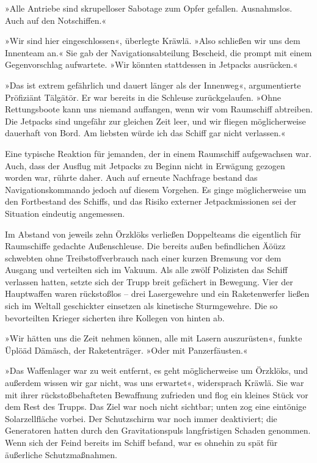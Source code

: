 »Alle Antriebe sind skrupelloser Sabotage zum Opfer gefallen. Ausnahmslos. Auch auf den Notschiffen.«

»Wir sind hier eingeschlossen«, überlegte Kräwlä. »Also schließen wir uns dem Innenteam an.« Sie gab der Navigationsabteilung Bescheid, die prompt mit einem Gegenvorschlag aufwartete. »Wir könnten stattdessen in Jetpacks ausrücken.«

»Das ist extrem gefährlich und dauert länger als der Innenweg«, argumentierte Pröfiziänt Tälgätör. Er war bereits in die Schleuse zurückgelaufen. »Ohne Rettungsboote kann uns niemand auffangen, wenn wir vom Raumschiff abtreiben. Die Jetpacks sind ungefähr zur gleichen Zeit leer, und wir fliegen möglicherweise dauerhaft von Bord. Am liebsten würde ich das Schiff gar nicht verlassen.«

Eine typische Reaktion für jemanden, der in einem Raumschiff aufgewachsen war. Auch, dass der Ausflug mit Jetpacks zu Beginn nicht in Erwägung gezogen worden war, rührte daher. Auch auf erneute Nachfrage bestand das Navigationskommando jedoch auf diesem Vorgehen. Es ginge möglicherweise um den Fortbestand des Schiffs, und das Risiko externer Jetpackmissionen sei der Situation eindeutig angemessen.

Im Abstand von jeweils zehn Örzklöks verließen Doppelteams die eigentlich für Raumschiffe gedachte Außenschleuse. Die bereits außen befindlichen Äöüzz schwebten ohne Treibstoffverbrauch nach einer kurzen Bremsung vor dem Ausgang und verteilten sich im Vakuum. Als alle zwölf Polizisten das Schiff verlassen hatten, setzte sich der Trupp breit gefächert in Bewegung. Vier der Hauptwaffen waren rückstoßlos – drei Lasergewehre und ein Raketenwerfer ließen sich im Weltall geschickter einsetzen als kinetische Sturmgewehre. Die so bevorteilten Krieger sicherten ihre Kollegen von hinten ab.

»Wir hätten uns die Zeit nehmen können, alle mit Lasern auszurüsten«, funkte Üplöäd Dämäsch, der Raketenträger. »Oder mit Panzerfäusten.«

»Das Waffenlager war zu weit entfernt, es geht möglicherweise um Örzklöks, und außerdem wissen wir gar nicht, was uns erwartet«, widersprach Kräwlä. Sie war mit ihrer rückstoßbehafteten Bewaffnung zufrieden und flog ein kleines Stück vor dem Rest des Trupps. Das Ziel war noch nicht sichtbar; unten zog eine eintönige Solarzellfläche vorbei. Der Schutzschirm war noch immer deaktiviert; die Generatoren hatten durch den Gravitationspuls langfristigen Schaden genommen. Wenn sich der Feind bereits im Schiff befand, war es ohnehin zu spät für äußerliche Schutzmaßnahmen.

